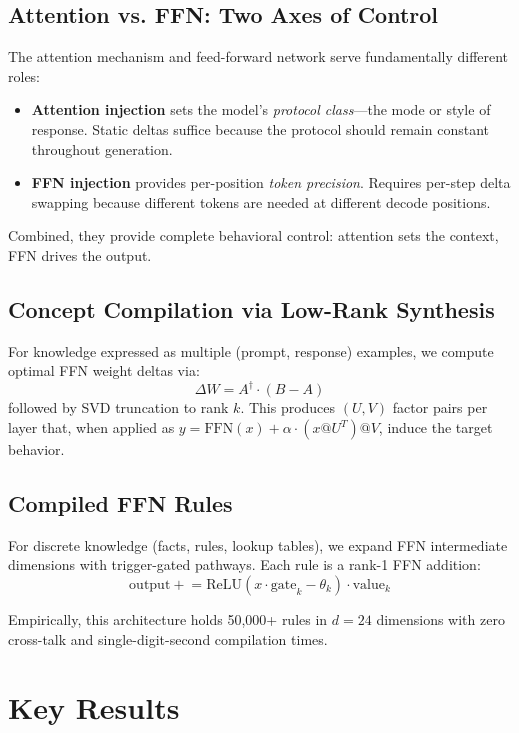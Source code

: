 \documentclass[11pt,a4paper]{article}
\begin{document}
\subsection{Attention vs. FFN: Two Axes of Control}

The attention mechanism and feed-forward network serve fundamentally different roles:

\begin{itemize}[leftmargin=*]
\item \textbf{Attention injection} sets the model's \emph{protocol class}---the mode or style of response. Static deltas suffice because the protocol should remain constant throughout generation.
\item \textbf{FFN injection} provides per-position \emph{token precision}. Requires per-step delta swapping because different tokens are needed at different decode positions.
\end{itemize}

Combined, they provide complete behavioral control: attention sets the context, FFN drives the output.

\subsection{Concept Compilation via Low-Rank Synthesis}

For knowledge expressed as multiple (prompt, response) examples, we compute optimal FFN weight deltas via:
\[
\Delta W = A^{\dagger} \cdot (B - A)
\]
followed by SVD truncation to rank $k$. This produces $(U,V)$ factor pairs per layer that, when applied as $y = \text{FFN}(x) + \alpha \cdot (x @ U^T) @ V$, induce the target behavior.

\subsection{Compiled FFN Rules}

For discrete knowledge (facts, rules, lookup tables), we expand FFN intermediate dimensions with trigger-gated pathways. Each rule is a rank-1 FFN addition:
\[
\text{output} \mathrel{+}= \text{ReLU}(x \cdot \text{gate}_k - \theta_k) \cdot \text{value}_k
\]

Empirically, this architecture holds 50,000+ rules in $d=24$ dimensions with zero cross-talk and single-digit-second compilation times.

\section{Key Results}
\end{document}

